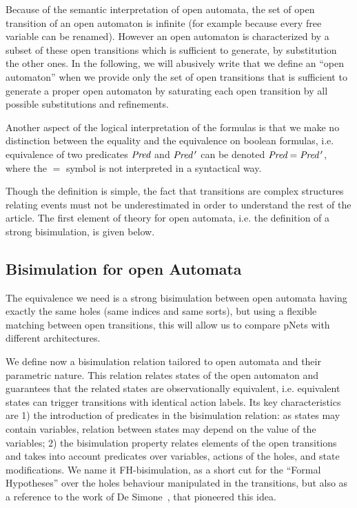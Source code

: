 \documentclass{lmcs}
\newcommand{\LUDO}[1]{\textcolor{darkgreen}{#1}}
\begin{document}
Because of the semantic interpretation of open automata, the set of open transition of an open automaton is infinite (for example because every free variable can be renamed). However an open automaton is characterized by a  subset of these open transitions which is sufficient to generate, by substitution the other ones. In the following, we will abusively write that we define an ``open automaton'' when we provide only the set of open transitions that is sufficient to generate a proper open automaton by saturating each open transition by all possible substitutions and refinements.

Another aspect of the logical interpretation of the
formulas is that we make no distinction between the equality and the
equivalence on boolean formulas, i.e. equivalence of two predicates
$\Pred$ and $\Pred\,'$ can be denoted $\Pred=\Pred\,'$, where the $=$ symbol is not interpreted in a syntactical way.

	
Though the definition is simple, the fact that transitions are complex structures relating events must not be underestimated in order to understand the rest of the article. The first element of theory for open automata, i.e. the definition of a strong bisimulation, is given below.


\subsection{Bisimulation for open Automata}
\label{section:bisimulation}


The equivalence we need is a strong bisimulation between
open automata having exactly the same holes (same indices and same sorts), but using a
flexible matching 
between open transitions, this will allow us to compare pNets
with different architectures.

We define now a bisimulation relation tailored to open automata and their parametric nature. This relation relates states of the open automaton and guarantees that the related states are observationally equivalent, i.e. equivalent states can trigger transitions with identical action labels. Its key characteristics are 1) the introduction of predicates in the bisimulation relation: as states may contain variables, relation between states may depend on the value of the variables; 2) the bisimulation property relates elements of the open transitions and takes into account predicates over variables, actions of the holes, and state modifications.
 We name it FH-bisimulation,
 as a short cut for the ``Formal Hypotheses'' over the holes behaviour manipulated in the
 transitions, but also as a reference to the work of De Simone~\cite{deSimone85},
 that pioneered this idea.
\end{document}
